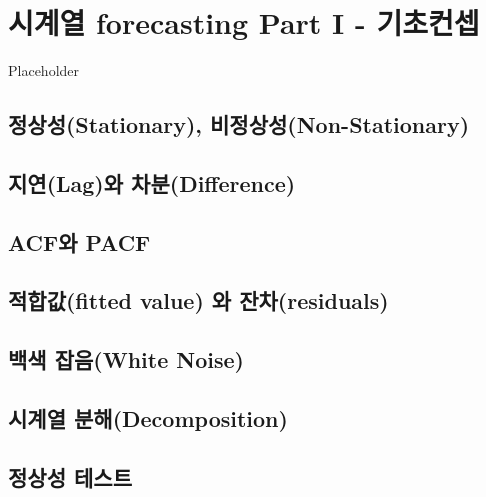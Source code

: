\documentclass[
]{book}
\begin{document}
\hypertarget{uxc2dcuxacc4uxc5f4-forecasting-part-i---uxae30uxcd08uxcee8uxc149}{%
\chapter{시계열 forecasting Part I - 기초컨셉}\label{uxc2dcuxacc4uxc5f4-forecasting-part-i---uxae30uxcd08uxcee8uxc149}}

Placeholder

\hypertarget{uxc815uxc0c1uxc131stationary-uxbe44uxc815uxc0c1uxc131non-stationary}{%
\section{정상성(Stationary), 비정상성(Non-Stationary)}\label{uxc815uxc0c1uxc131stationary-uxbe44uxc815uxc0c1uxc131non-stationary}}

\hypertarget{uxc9c0uxc5f0laguxc640-uxcc28uxbd84difference}{%
\section{지연(Lag)와 차분(Difference)}\label{uxc9c0uxc5f0laguxc640-uxcc28uxbd84difference}}

\hypertarget{acfuxc640-pacf}{%
\section{ACF와 PACF}\label{acfuxc640-pacf}}

\hypertarget{uxc801uxd569uxac12fitted-value-uxc640-uxc794uxcc28residuals}{%
\section{적합값(fitted value) 와 잔차(residuals)}\label{uxc801uxd569uxac12fitted-value-uxc640-uxc794uxcc28residuals}}

\hypertarget{uxbc31uxc0c9-uxc7a1uxc74cwhite-noise}{%
\section{백색 잡음(White Noise)}\label{uxbc31uxc0c9-uxc7a1uxc74cwhite-noise}}

\hypertarget{uxc2dcuxacc4uxc5f4-uxbd84uxd574decomposition}{%
\section{시계열 분해(Decomposition)}\label{uxc2dcuxacc4uxc5f4-uxbd84uxd574decomposition}}

\hypertarget{uxc815uxc0c1uxc131-uxd14cuxc2a4uxd2b8}{%
\section{정상성 테스트}\label{uxc815uxc0c1uxc131-uxd14cuxc2a4uxd2b8}}
\end{document}

